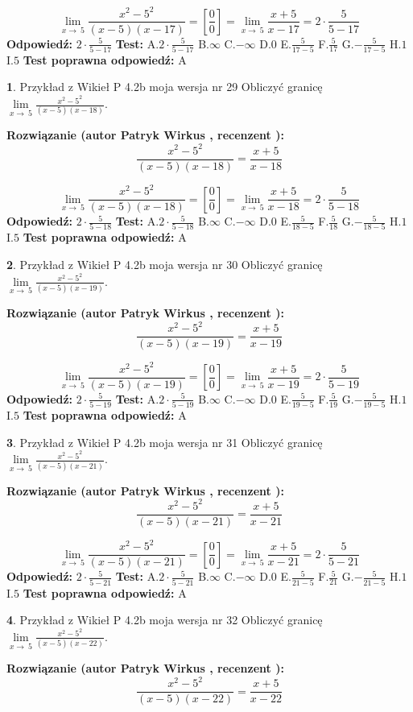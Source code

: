 \documentclass[12pt, a4paper]{article}
\theoremstyle{definition} %
\newtheorem{zad}{}
\newcommand{\zadStart}[1]{\begin{zad}#1\newline}
\newcommand{\zadStop}{\end{zad}}
\newcommand{\rozwStart}[2]{\noindent \textbf{Rozwiązanie (autor #1 , recenzent #2): }\newline}
\newcommand{\rozwStop}{\newline}
\newcommand{\odpStart}{\noindent \textbf{Odpowiedź:}\newline}
\newcommand{\odpStop}{\newline}
\newcommand{\testStart}{\noindent \textbf{Test:}\newline}
\newcommand{\testStop}{\newline}
\newcommand{\kluczStart}{\noindent \textbf{Test poprawna odpowiedź:}\newline}
\newcommand{\kluczStop}{\newline}
\begin{document}
$$\lim\limits_{x\to\ 5}\frac{x^{2}-5^{2}}{(x-5)(x-17)}=[\frac{0}{0}]=\lim\limits_{x\to\ 5}\frac{x+5}{x-17}=2 \cdot \frac{5}{5-17}$$
\rozwStop
\odpStart
$2 \cdot \frac{5}{5-17}$
\odpStop
\testStart
A.$2 \cdot \frac{5}{5-17}$
B.$\infty$
C.$-\infty$
D.$0$
E.$\frac{5}{17-5}$
F.$\frac{5}{17}$
G.$-\frac{5}{17-5}$
H.$1$
I.$5$
\testStop
\kluczStart
A
\kluczStop



\zadStart{Przykład z Wikieł P 4.2b moja wersja nr 29}
Obliczyć granicę $\lim\limits_{x\to\ 5}\frac{x^{2}-5^{2}}{(x-5)(x-18)}$.
\zadStop
\rozwStart{Patryk Wirkus}{}
$$\frac{x^{2}-5^{2}}{(x-5)(x-18)}=\frac{x+5}{x-18}$$

$$\lim\limits_{x\to\ 5}\frac{x^{2}-5^{2}}{(x-5)(x-18)}=[\frac{0}{0}]=\lim\limits_{x\to\ 5}\frac{x+5}{x-18}=2 \cdot \frac{5}{5-18}$$
\rozwStop
\odpStart
$2 \cdot \frac{5}{5-18}$
\odpStop
\testStart
A.$2 \cdot \frac{5}{5-18}$
B.$\infty$
C.$-\infty$
D.$0$
E.$\frac{5}{18-5}$
F.$\frac{5}{18}$
G.$-\frac{5}{18-5}$
H.$1$
I.$5$
\testStop
\kluczStart
A
\kluczStop



\zadStart{Przykład z Wikieł P 4.2b moja wersja nr 30}
Obliczyć granicę $\lim\limits_{x\to\ 5}\frac{x^{2}-5^{2}}{(x-5)(x-19)}$.
\zadStop
\rozwStart{Patryk Wirkus}{}
$$\frac{x^{2}-5^{2}}{(x-5)(x-19)}=\frac{x+5}{x-19}$$

$$\lim\limits_{x\to\ 5}\frac{x^{2}-5^{2}}{(x-5)(x-19)}=[\frac{0}{0}]=\lim\limits_{x\to\ 5}\frac{x+5}{x-19}=2 \cdot \frac{5}{5-19}$$
\rozwStop
\odpStart
$2 \cdot \frac{5}{5-19}$
\odpStop
\testStart
A.$2 \cdot \frac{5}{5-19}$
B.$\infty$
C.$-\infty$
D.$0$
E.$\frac{5}{19-5}$
F.$\frac{5}{19}$
G.$-\frac{5}{19-5}$
H.$1$
I.$5$
\testStop
\kluczStart
A
\kluczStop



\zadStart{Przykład z Wikieł P 4.2b moja wersja nr 31}
Obliczyć granicę $\lim\limits_{x\to\ 5}\frac{x^{2}-5^{2}}{(x-5)(x-21)}$.
\zadStop
\rozwStart{Patryk Wirkus}{}
$$\frac{x^{2}-5^{2}}{(x-5)(x-21)}=\frac{x+5}{x-21}$$

$$\lim\limits_{x\to\ 5}\frac{x^{2}-5^{2}}{(x-5)(x-21)}=[\frac{0}{0}]=\lim\limits_{x\to\ 5}\frac{x+5}{x-21}=2 \cdot \frac{5}{5-21}$$
\rozwStop
\odpStart
$2 \cdot \frac{5}{5-21}$
\odpStop
\testStart
A.$2 \cdot \frac{5}{5-21}$
B.$\infty$
C.$-\infty$
D.$0$
E.$\frac{5}{21-5}$
F.$\frac{5}{21}$
G.$-\frac{5}{21-5}$
H.$1$
I.$5$
\testStop
\kluczStart
A
\kluczStop



\zadStart{Przykład z Wikieł P 4.2b moja wersja nr 32}
Obliczyć granicę $\lim\limits_{x\to\ 5}\frac{x^{2}-5^{2}}{(x-5)(x-22)}$.
\zadStop
\rozwStart{Patryk Wirkus}{}
$$\frac{x^{2}-5^{2}}{(x-5)(x-22)}=\frac{x+5}{x-22}$$
\end{document}
